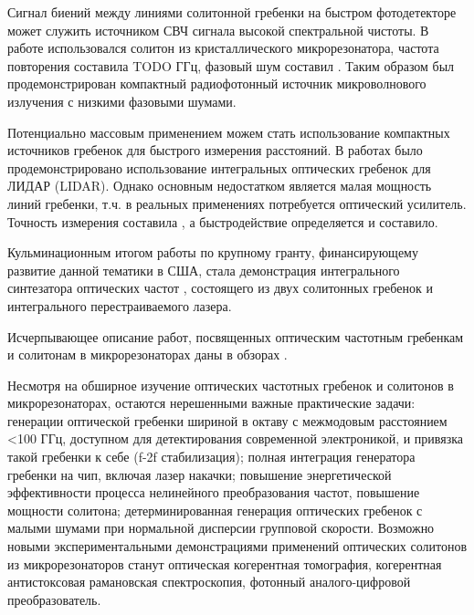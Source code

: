 Сигнал биений между линиями солитонной гребенки на быстром фотодетекторе может служить источником СВЧ сигнала высокой спектральной чистоты. В работе \cite{} использовался солитон из кристаллического микрорезонатора, частота повторения составила TODO ГГц, фазовый шум составил . Таким образом был продемонстрирован компактный радиофотонный источник микроволнового излучения с низкими фазовыми шумами.

Потенциально массовым применением можем стать использование компактных источников гребенок для быстрого измерения расстояний. В работах \cite{} было продемонстрировано использование интегральных оптических гребенок для ЛИДАР (LIDAR). Однако основным недостатком является малая мощность линий гребенки, т.ч. в реальных применениях потребуется оптический усилитель. Точность измерения составила , а быстродействие определяется и составило.

Кульминационным итогом работы по крупному гранту, финансирующему развитие данной тематики в США, стала демонстрация интегрального синтезатора оптических частот \cite{}, состоящего из двух солитонных гребенок и интегрального перестраиваемого лазера.

Исчерпывающее описание работ, посвященных оптическим частотным гребенкам и солитонам в микрорезонаторах даны в обзорах \cite{Kippenberg2011,ASavchenkov2016,ChemboY2016,PASQUAZI20181,Kippenbergeaan8083}.

Несмотря на обширное изучение оптических частотных гребенок и солитонов в микрорезонаторах, остаются нерешенными важные практические задачи: генерации оптической гребенки шириной в октаву с межмодовым расстоянием <100 ГГц, доступном для детектирования современной электроникой, и привязка такой гребенки к себе (f-2f стабилизация); полная интеграция генератора гребенки на чип, включая лазер накачки; повышение энергетической эффективности процесса нелинейного преобразования частот, повышение мощности солитона; детерминированная генерация оптических гребенок с малыми шумами при нормальной дисперсии групповой скорости. Возможно новыми экспериментальными демонстрациями применений оптических солитонов из микрорезонаторов станут оптическая когерентная томография, когерентная антистоксовая рамановская спектроскопия, фотонный аналого-цифровой преобразователь. 



